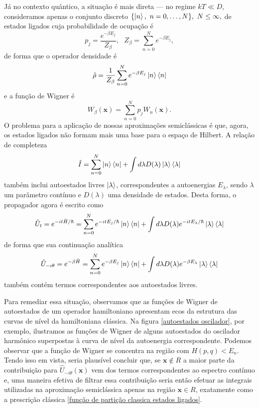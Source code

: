\documentclass[
	12pt,
	oneside,			%
	a4paper,			%
	english,			%
	brazil				%
	]{abntex2}
\theoremstyle{definition}
\begin{document}
Já no contexto quântico, a situação é mais direta — no regime $kT \ll D$, consideramos apenas o conjunto discreto $\{ \ket{n} , \ n=0,\ldots,N\}, \ N \le \infty,$ de estados ligados cuja probabilidade de ocupação é
\begin{equation}
    p_j = \frac{e^{-\beta E_j}}{Z_\beta}, \ \ \ Z_\beta = \sum_{n=0}^{N} e^{-\beta E_j},
\end{equation}
de forma que o operador densidade é
\begin{equation}
    \hat{\rho} = \frac{1}{Z_\beta}\sum_{n=0}^{N} e^{-\beta E_j} \ket{n} \bra{n}
\end{equation}
e a função de Wigner é
\begin{equation}
    W_\beta(\mathbf{x}) = \sum_{n=0}^{N} p_j W_n(\mathbf{x}) .
\end{equation}
O problema para a aplicação de nossas aproximações semiclássicas é que, agora, os estados ligados não formam mais uma base para o espaço de Hilbert. A relação de completeza
\begin{equation}
    \hat{I} = \sum_{n=0}^{N} \ket{n} \bra{n} + \int d \lambda D(\lambda) \ket{\lambda} \bra{\lambda}
\end{equation}
também inclui autoestados livres $\ket{\lambda}$, correspondentes a autoenergias $E_\lambda$, sendo $\lambda$ um parâmetro contínuo e $D(\lambda)$ uma densidade de estados. Desta forma, o propagador agora é escrito como
\begin{equation}
    \hat{U}_t = e^{-it \hat{H}/\hbar} = \sum_{n=0}^{N} e^{-it E_j/\hbar} \ket{n} \bra{n} + \int d \lambda D(\lambda) e^{-it E_\lambda/\hbar} \ket{\lambda} \bra{\lambda} 
\end{equation}
de forma que sua continuação analítica
\begin{equation}
    \hat{U}_{-i\theta} = e^{-\beta \hat{H}} = \sum_{n=0}^{N} e^{-\beta E_j} \ket{n} \bra{n} + \int d \lambda D(\lambda)  e^{-\beta E_\lambda } \ket{\lambda} \bra{\lambda}
\end{equation}
também contém termos correspondentes aos autoestados livres.

Para remediar essa situação, observamos que as funções de Wigner de autoestados de um operador hamiltoniano apresentam ecos da estrutura das curvas de nível da hamiltoniana clássica. Na figura \ref{autoestados oscilador}, por exemplo, ilustramos as funções de Wigner de alguns autoestados do oscilador harmônico superpostas à curva de nível da autoenergia correspondente. Podemos observar que a função de Wigner se concentra na região com $H(p,q)<E_n$. Tendo isso em vista, seria plausível concluir que, se $\mathbf{x} \notin R$ a maior parte da contribuição para $\hat{U}_{-i\theta}(\mathbf{x})$ vem dos termos correspondentes ao espectro contínuo e, uma maneira efetiva de filtrar essa contribuição seria então efetuar as integrais utilizadas na aproximação semiclássica apenas na região $\mathbf{x} \in R$, exatamente como a prescrição clássica \eqref{função de partição classica estados ligados}. 
\end{document}
